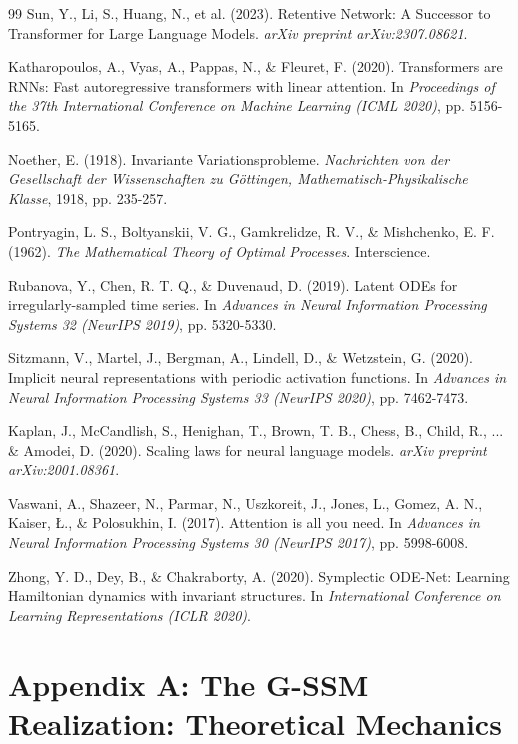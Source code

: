 \documentclass[12pt,a4paper]{article}
\begin{document}
\begin{thebibliography}{99}
Sun, Y., Li, S., Huang, N., et al. (2023). Retentive Network: A Successor to Transformer for Large Language Models. \textit{arXiv preprint arXiv:2307.08621}.

Katharopoulos, A., Vyas, A., Pappas, N., \& Fleuret, F. (2020). Transformers are RNNs: Fast autoregressive transformers with linear attention. In \textit{Proceedings of the 37th International Conference on Machine Learning (ICML 2020)}, pp. 5156-5165.

Noether, E. (1918). Invariante Variationsprobleme. \textit{Nachrichten von der Gesellschaft der Wissenschaften zu Göttingen, Mathematisch-Physikalische Klasse}, 1918, pp. 235-257.

Pontryagin, L. S., Boltyanskii, V. G., Gamkrelidze, R. V., \& Mishchenko, E. F. (1962). \textit{The Mathematical Theory of Optimal Processes}. Interscience.

Rubanova, Y., Chen, R. T. Q., \& Duvenaud, D. (2019). Latent ODEs for irregularly-sampled time series. In \textit{Advances in Neural Information Processing Systems 32 (NeurIPS 2019)}, pp. 5320-5330.

Sitzmann, V., Martel, J., Bergman, A., Lindell, D., \& Wetzstein, G. (2020). Implicit neural representations with periodic activation functions. In \textit{Advances in Neural Information Processing Systems 33 (NeurIPS 2020)}, pp. 7462-7473.

Kaplan, J., McCandlish, S., Henighan, T., Brown, T. B., Chess, B., Child, R., ... \& Amodei, D. (2020). Scaling laws for neural language models. \textit{arXiv preprint arXiv:2001.08361}.

Vaswani, A., Shazeer, N., Parmar, N., Uszkoreit, J., Jones, L., Gomez, A. N., Kaiser, {\L}., \& Polosukhin, I. (2017). Attention is all you need. In \textit{Advances in Neural Information Processing Systems 30 (NeurIPS 2017)}, pp. 5998-6008.

Zhong, Y. D., Dey, B., \& Chakraborty, A. (2020). Symplectic ODE-Net: Learning Hamiltonian dynamics with invariant structures. In \textit{International Conference on Learning Representations (ICLR 2020)}.

\end{thebibliography}

\appendix
\section{Appendix A: The G-SSM Realization: Theoretical Mechanics}
\label{sec:appendix-gssm}
\end{document}
